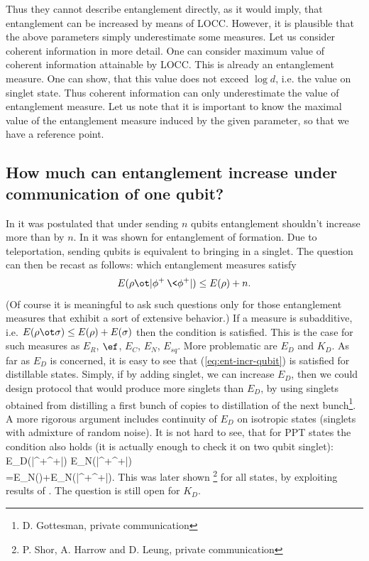 \documentclass[rmp,12pt,preprint]{revtex4-2}
\begin{document}
Thus they cannot describe entanglement directly, as it would imply,
that entanglement can be increased by means of LOCC. However, it is
plausible that the above parameters simply underestimate some
measures.  Let us consider coherent information in more detail.  One
can consider maximum value of coherent information attainable by
LOCC. This is already an entanglement measure.  One can show, that
this value does not exceed $\log d$, i.e. the value on singlet state.
Thus coherent information can only underestimate the value of
entanglement measure. Let us note that it is important to know the
maximal value of the entanglement measure induced by the given
parameter, so that we have a reference point.

\subsection{How much can entanglement increase under communication of one qubit?}

In \cite{LoPopescu} it was postulated that under sending $n$ qubits
entanglement shouldn't increase more than by $n$. In
\cite{ChenYang2000-ent-qubit} it was shown for entanglement of
formation.  Due to teleportation, sending qubits is equivalent to
bringing in a singlet. The question can then be recast as follows:
which entanglement measures satisfy
\begin{equation}
  E(\rho\ot |\phi^+\>\<\phi^+|) \leq E(\rho) + n.
  \label{eq:ent-incr-qubit}
\end{equation}
(Of course it is meaningful to ask such questions only for those
entanglement measures that exhibit a sort of extensive behavior.) If a
measure is subadditive, i.e. $E(\rho\ot \sigma) \leq
E(\rho)+E(\sigma)$ then the condition is satisfied. This is the case
for such measures as $E_R$, $\ef$, $E_C$, $E_N$, $E_{sq}$. More
problematic are $E_D$ and $K_D$. As far as $E_D$ is concerned, it is
easy to see that (\ref{eq:ent-incr-qubit}) is satisfied for
distillable states.  Simply, if by adding singlet, we can increase
$E_D$, then we could design protocol that would produce more singlets
than $E_D$, by using singlets obtained from distilling a first bunch
of copies to distillation of the next bunch\footnote{D. Gottesman,
private communication}. A more rigorous argument
includes continuity of $E_D$ on isotropic states (singlets with
admixture of random noise).  It is not hard to see, that for PPT
states the condition also holds (it is actually enough to check it on
two qubit singlet):
\ben
E_D(\rho\ot |\phi^+\>\<\phi^+|)\leq
E_N(\rho\ot |\phi^+\>\<\phi^+|)\nonumber \\
=E_N(\rho)+E_N(|\phi^+\>\<\phi^+|).
\een
This was later shown \footnote{P. Shor, A. Harrow and D. Leung, private communication} for all states, by
exploiting results of \cite{DiVincenzoMSST1999-UPB-huge}. The question
is still open for $K_D$.
\end{document}
